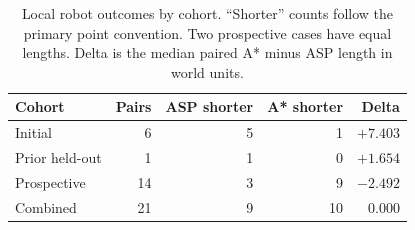 \begin{table}[!t]
\caption{Local robot outcomes by cohort. ``Shorter'' counts follow the primary point convention. Two prospective cases have equal lengths. Delta is the median paired A* minus ASP length in world units.}\label{tab:robot}
\centering\begin{tabular}{lrrrr}\toprule
Cohort &Pairs&ASP shorter&A* shorter&Delta\\\midrule
Initial &6&5&1&$+7.403$\\
Prior held-out &1&1&0&$+1.654$\\
Prospective &14&3&9&$-2.492$\\\midrule
Combined &21&9&10&$0.000$\\\bottomrule
\end{tabular}
\end{table}
